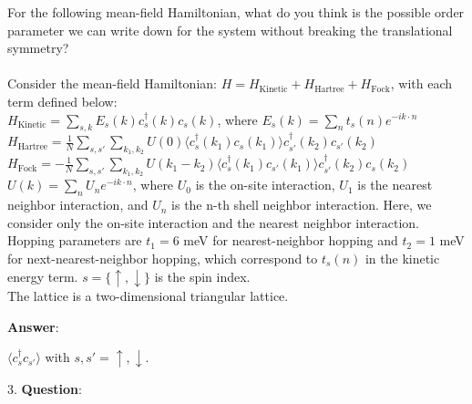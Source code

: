 \documentclass{article}
\begin{document}
   For the following mean-field Hamiltonian, what do you think is the possible order parameter we can write down for the system without breaking the translational symmetry? \\ \\Consider the mean-field Hamiltonian: $H = H_{\text{Kinetic}} + H_{\text{Hartree}} +H_{\text{Fock}}$, with each term defined below: \\$H_{\text{Kinetic}} = \sum_{s, k} E_s(k) c^\dagger_s(k) c_s(k)$, where $E_s(k)=\sum_{n} t_s(n) e^{-i k \cdot n}$  \\$H_{\text{Hartree}} = \frac{1}{N} \sum_{s, s'} \sum_{k_1, k_2} U(0) \langle c_s^\dagger(k_1) c_s(k_1) \rangle c_{s'}^\dagger(k_2) c_{s'}(k_2)$ \\$H_{\text{Fock}} = -\frac{1}{N} \sum_{s, s'} \sum_{k_1, k_2} U(k_1 - k_2) \langle c_s^\dagger(k_1) c_{s'}(k_1) \rangle c_{s'}^\dagger(k_2) c_s(k_2)$ \\$U(k) = \sum_{n} U_n e^{-i k \cdot n}$, where $U_0$ is the on-site interaction, $U_1$ is the nearest neighbor interaction, and $U_n$ is the n-th shell neighbor interaction. Here, we consider only the on-site interaction and the nearest neighbor interaction. \\Hopping parameters are $t_1 = 6$ meV for nearest-neighbor hopping and $t_2 = 1$ meV for next-nearest-neighbor hopping, which correspond to $t_s(n)$ in the kinetic energy term. $s = \{\uparrow, \downarrow\}$ is the spin index. \\The lattice is a two-dimensional triangular lattice.

   \textbf{Answer}:

   $\langle c^\dagger_{s} c_{s'} \rangle$ with $s,s'=\uparrow,\downarrow$. \\


\clearpage

3. \textbf{Question}:
\end{document}
